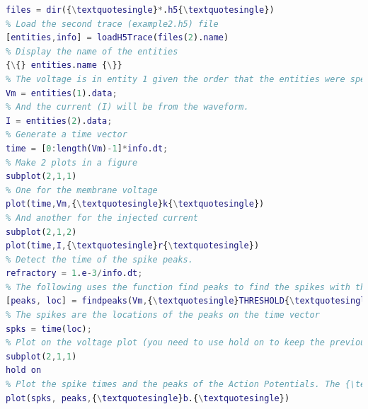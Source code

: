 \begin{lstlisting}[language=matlab,morekeywords={loadH5Trace,ls},escapeinside=\{\}]
% List files that follow the filter *.h5
files = dir({\textquotesingle}*.h5{\textquotesingle})
% Load the second trace (example2.h5) file
[entities,info] = loadH5Trace(files(2).name)
% Display the name of the entities
{\{} entities.name {\}}
% The voltage is in entity 1 given the order that the entities were specified.
Vm = entities(1).data;
% And the current (I) will be from the waveform.
I = entities(2).data;
% Generate a time vector
time = [0:length(Vm)-1]*info.dt;
% Make 2 plots in a figure 
subplot(2,1,1)
% One for the membrane voltage
plot(time,Vm,{\textquotesingle}k{\textquotesingle})
% And another for the injected current
subplot(2,1,2)
plot(time,I,{\textquotesingle}r{\textquotesingle})
% Detect the time of the spike peaks.
refractory = 1.e-3/info.dt; 
% The following uses the function find peaks to find the spikes with threshold crossing at 0mV and a refractory period. 
[peaks, loc] = findpeaks(Vm,{\textquotesingle}THRESHOLD{\textquotesingle},0,{\textquotesingle}MINPEAKDISTANCE{\textquotesingle},refractory);
% The spikes are the locations of the peaks on the time vector
spks = time(loc);
% Plot on the voltage plot (you need to use hold on to keep the previous plot)
subplot(2,1,1)
hold on
% Plot the spike times and the peaks of the Action Potentials. The {\textquotesingle}hold on{\textquotesingle} command makes that the plots overlap.
plot(spks, peaks,{\textquotesingle}b.{\textquotesingle})

\end{lstlisting}
 \fi
 
